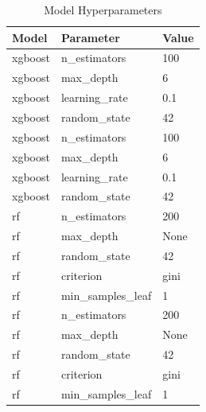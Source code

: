 \begin{table}[htbp]
\centering
\caption{Model Hyperparameters}
\label{tab:hyperparameters}
\begin{tabular}{lll}
\toprule
Model & Parameter & Value \\
\midrule
xgboost & n\_estimators & 100 \\
xgboost & max\_depth & 6 \\
xgboost & learning\_rate & 0.1 \\
xgboost & random\_state & 42 \\
xgboost & n\_estimators & 100 \\
xgboost & max\_depth & 6 \\
xgboost & learning\_rate & 0.1 \\
xgboost & random\_state & 42 \\
rf & n\_estimators & 200 \\
rf & max\_depth & None \\
rf & random\_state & 42 \\
rf & criterion & gini \\
rf & min\_samples\_leaf & 1 \\
rf & n\_estimators & 200 \\
rf & max\_depth & None \\
rf & random\_state & 42 \\
rf & criterion & gini \\
rf & min\_samples\_leaf & 1 \\
\bottomrule
\end{tabular}
\end{table}